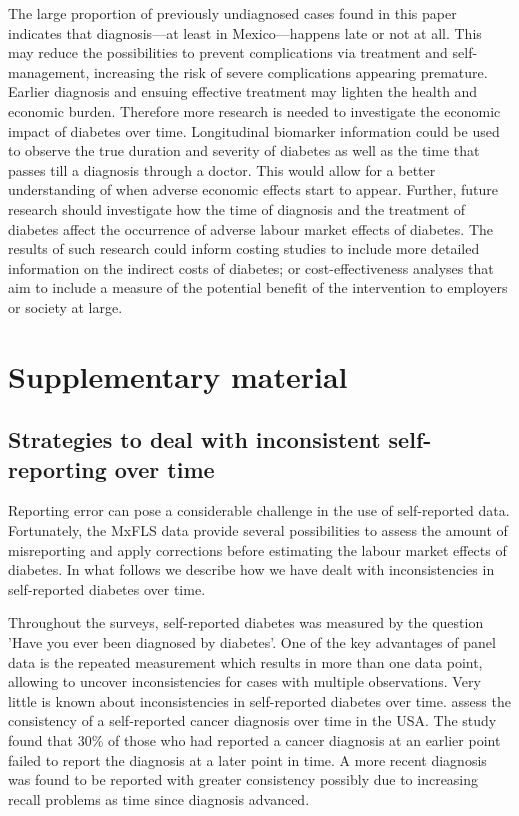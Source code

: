 \documentclass[12pt,english]{article}
\begin{document}
The large proportion of previously undiagnosed cases found in this paper indicates that diagnosis—at least in Mexico—happens late or not at all. This may reduce the possibilities to prevent complications via treatment and self-management, increasing the risk of severe complications appearing premature. Earlier diagnosis and ensuing effective treatment may lighten the health and economic burden. Therefore more research is needed to investigate the economic impact of diabetes over time. Longitudinal biomarker information could be used to observe the true duration and severity of diabetes as well as the time that passes till a diagnosis through a doctor. This would allow for a better understanding of when adverse economic effects start to appear. Further, future research should investigate how the time of diagnosis and the treatment of diabetes affect the occurrence of adverse labour market effects of diabetes. The results of such research could inform costing studies to include more detailed information on the indirect costs of diabetes; or cost-effectiveness analyses that aim to include a measure of the potential benefit of the intervention to employers or society at large. 

\printbibliography

	
\clearpage
\setcounter{table}{0}
\renewcommand{\thetable}{S\arabic{table}}
\setcounter{figure}{0}
\setcounter{page}{1}
\renewcommand{\thefigure}{S\arabic{figure}} %
\section*{Supplementary material}

\subsection*{\label{sec:Appendix}Strategies to deal with inconsistent self-reporting over time}

Reporting error can pose a considerable challenge in the use of self-reported data. Fortunately, the \ac{MxFLS} data provide several possibilities to assess the amount of misreporting and apply corrections before estimating the labour market effects of diabetes. In what follows we describe how we have dealt with inconsistencies in self-reported diabetes over time.

Throughout the surveys, self-reported diabetes was measured by the question 'Have you ever been diagnosed by diabetes'. One of the key advantages of panel data is the repeated measurement which results in more than one data point, allowing to uncover inconsistencies for cases with multiple observations. Very little is known about inconsistencies in self-reported diabetes over time. \textcite{Zajacova2010} assess the consistency of a self-reported cancer diagnosis over time in the USA. The study found that 30\% of those who had reported a cancer diagnosis at an earlier point failed to report the diagnosis at a later point in time. A more recent diagnosis was found to be reported with greater consistency possibly due to increasing recall problems as time since diagnosis advanced.
\end{document}
